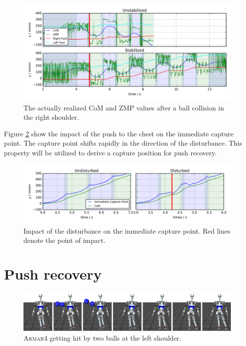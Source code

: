 \documentclass[english,ngerman]{KITreprt}
\newcommand{\name}[1]{\textsc{#1}}
\begin{document}
\begin{figure}[hbt]
\vspace*{-1em}
\includegraphics[width=\textwidth,resolution=300]{images/disturbed_right_straight_x.png}
\caption{The actually realized CoM and ZMP values after a ball collision in the right shoulder.}
\label{img:disturbed-right-straight-x}
\end{figure}

Figure \ref{img:cp-disturbance-front-y} show the impact of the push to
the chest on the immediate capture point. The capture point shifts
rapidly in the direction of the disturbance. This property will be
utilized to derive a capture position for push recovery.

\begin{figure}[H]
\vspace*{-1em}
\includegraphics[width=\textwidth,resolution=300]{images/cp_disturbance_front_y.png}
\caption{Impact of the disturbance on the immediate capture point. Red lines denote the point of impact.}
\label{img:cp-disturbance-front-y}
\end{figure}

\section{Push recovery}\label{push-recovery-1}

\begin{figure}[H]
\vspace*{-1em}
\includegraphics[width=\textwidth,resolution=300]{images/push_recovery_thumbs.png}
\caption{\name{Armar4} getting hit by two balls at the left shoulder.}
\label{img:push-recovery-thumbs}
\end{figure}
\end{document}
